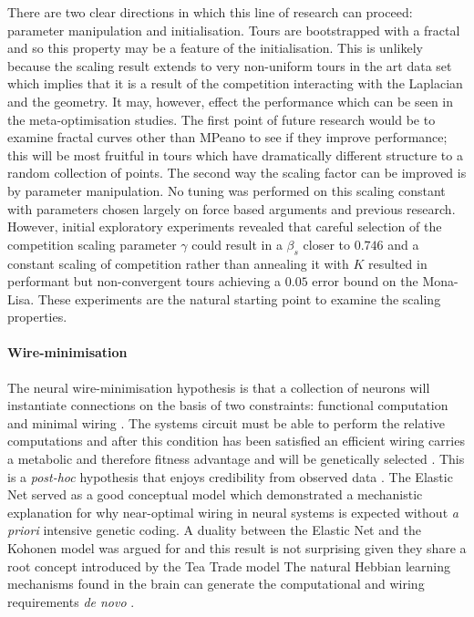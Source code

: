  There are two clear directions in which this line of research can proceed: parameter manipulation and initialisation. Tours are bootstrapped with a fractal and so this property may be a feature of the initialisation. This is unlikely because the scaling result extends to very non-uniform tours in the art data set which implies that it is a result of the competition interacting with the Laplacian and the geometry. It may, however, effect the performance which can be seen in the meta-optimisation studies. The first point of future research would be to examine fractal curves other than MPeano to see if they improve performance; this will be most fruitful in tours which have dramatically different structure to a random collection of points. The second way  the scaling factor can be improved is by parameter manipulation. No tuning was performed on this scaling constant with parameters chosen largely on force based arguments and previous research. However, initial exploratory experiments revealed that careful selection of the competition scaling parameter $\gamma$ could result in a $\beta_s$ closer to $0.746$ and a constant scaling of competition rather than annealing it with $K$ resulted in performant but non-convergent tours achieving a $0.05$ error bound on the Mona-Lisa. These experiments are the natural starting point to examine the scaling properties.
\paragraph{Wire-minimisation}
The neural wire-minimisation hypothesis is that a collection of neurons will instantiate connections on the basis of two constraints: functional computation and minimal wiring \cite{Koulakov2001-je}. The systems circuit must be able to perform the relative computations and after this condition has been satisfied an efficient wiring carries a metabolic and therefore fitness advantage and will be genetically selected \cite{Koulakov2004-ia}. This is a \textit{post-hoc} hypothesis that enjoys credibility from observed data \cite{Bartha2019-ve, Vertes2012-uv}. The Elastic Net served as a good conceptual model which demonstrated a mechanistic explanation for why near-optimal wiring in neural systems is expected without \textit{a priori} intensive genetic coding. A duality between the Elastic Net and the Kohonen model was argued for and this result is not surprising given they share a root concept introduced by the Tea Trade model \cite{Mitchison1995-cb, Kohonen1990-ys, Willshaw1976-ew} The natural Hebbian learning mechanisms found in the brain can generate the computational and wiring requirements \textit{de novo} \cite{Durbin1990-tn, Swindale2001-gh}. 

